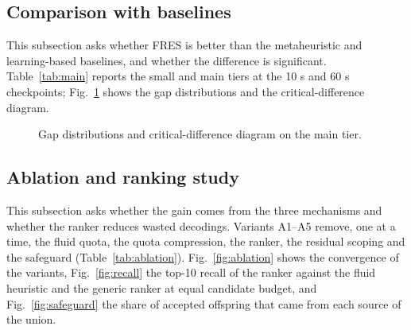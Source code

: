 \begin{table}
\centering\small
\caption{Hyperparameters (draft values; final values from the confirmed training-parameter table).}\label{tab:hyper}

\end{table}

\begin{table}
\centering\small
\caption{Baselines and their configuration.}\label{tab:baselines}

\end{table}

\subsection{Comparison with baselines}\label{sec:comparison}
This subsection asks whether FRES is better than the metaheuristic and learning-based baselines, and whether the difference is
significant. Table~\ref{tab:main} reports the small and main tiers at the 10 s and 60 s checkpoints; Fig.~\ref{fig:main}
shows the gap distributions and the critical-difference diagram. 

\begin{table}
\centering\small
\caption{Main results: mean $\pm$ std over \NumRuns{} runs; best in bold; $\dagger$ marks significance over the runner-up (Wilcoxon, $p < 0.05$). S = small tier (gap to the exact solution), M = main tier (gap to the reference).}\label{tab:main}

\end{table}

\begin{figure}
\caption{Gap distributions and critical-difference diagram on the main tier.}\label{fig:main}
\end{figure}

\subsection{Ablation and ranking study}\label{sec:ablation}
This subsection asks whether the gain comes from the three mechanisms and whether the ranker reduces wasted decodings.
Variants A1--A5 remove, one at a time, the fluid quota, the quota compression, the ranker, the residual scoping and the
safeguard (Table~\ref{tab:ablation}). Fig.~\ref{fig:ablation} shows the convergence of the variants, Fig.~\ref{fig:recall}
the top-10 recall of the ranker against the fluid heuristic and the generic ranker at equal candidate budget, and
Fig.~\ref{fig:safeguard} the share of accepted offspring that came from each source of the union. 

